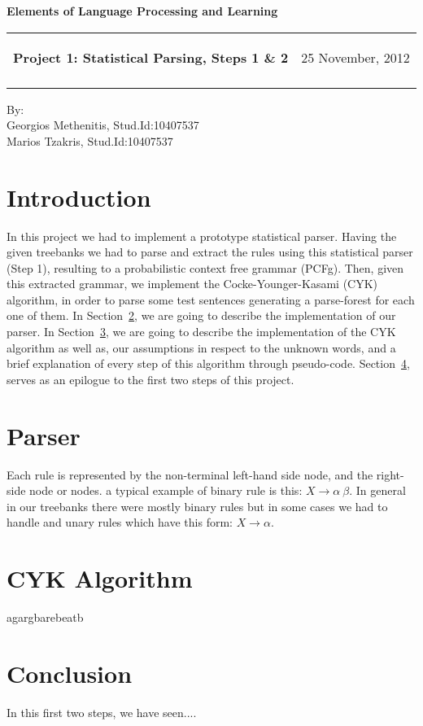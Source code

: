 \documentclass[a4paper,11pt]{article}
\makeatletter
\newcommand{\resheading}[1]{{\large \colorbox{mygrey}{\begin{minipage}{\textwidth}{\textbf{#1 \vphantom{p\^{E}}}}\end{minipage}}}}
\newcommand{\mywebheader}{
  \begin{tabular}{@{}p{5in}p{4in}}
  {\resheading{Project 1: Statistical Parsing, Steps 1 \& 2}} & {\Large 25 November, 2012}\\\vspace{0.2cm}
  \end{tabular}}
\makeatother
\begin{document}
\begin{center}
{\LARGE \textbf{Elements of Language Processing and Learning}}\\ [1em]
\end{center}
\mywebheader

\begin{center}
{\Large By:} \\ \vspace{0.1cm}
{\Large Georgios Methenitis, Stud.Id:10407537} \\ \vspace{0.1cm}
{\Large Marios Tzakris, Stud.Id:10407537}
\end{center}


\section{Introduction}
In this project we had to implement a prototype statistical parser. Having the given treebanks we had to parse and extract the rules using this statistical parser (Step 1), resulting to a probabilistic context free grammar (PCFg). Then, given this extracted grammar, we implement the Cocke-Younger-Kasami (CYK) algorithm, in order to parse some test sentences generating a parse-forest for each one of them. In Section~\ref{parser}, we are going to describe the implementation of our parser. In Section~\ref{cyk}, we  
are going to describe the implementation of the CYK algorithm as well as, our assumptions in respect to the unknown words, and a brief explanation of every step of this algorithm through pseudo-code. Section~\ref{concl}, serves as an epilogue to the first two steps of this project.
 


\section{Parser}
\label{parser}
Each rule is represented by the non-terminal left-hand side node, and the right-side node or nodes. a typical example of  binary rule is this: $X \rightarrow \alpha\	 \beta$. In general in our treebanks there were mostly binary rules but in some cases we had to handle and unary rules which have this form: $X \rightarrow \alpha$.




\section{CYK Algorithm}
\label{cyk}
agargbarebeatb

\section{Conclusion}
\label{concl}
In this first two steps, we have seen....
\end{document}
